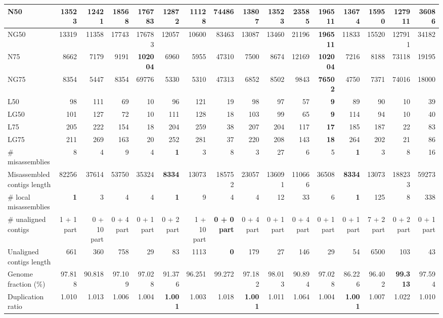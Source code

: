 \documentclass[12pt,a4paper]{article}
\begin{document}
\begin{table}[ht]
\begin{center}
\begin{tabular}{|l*{15}{|r}|}
N50 & 13523 & 12421 & 18568 & 176783 & 12872 & 11128 & 74486 & 13807 & 13523 & 23585 & {\bf 196511} & 13674 & 15950 & 127911 & 36086 \\ \hline
NG50 & 13319 & 11358 & 17743 & 176783 & 12057 & 10600 & 83463 & 13087 & 13460 & 21196 & {\bf 196511} & 11833 & 15520 & 127911 & 34182 \\ \hline
N75 & 8662 & 7179 & 9191 & {\bf 102004} & 6960 & 5955 & 47310 & 7500 & 8674 & 12169 & {\bf 102004} & 7216 & 8188 & 73118 & 19195 \\ \hline
NG75 & 8354 & 5447 & 8354 & 69776 & 5330 & 5310 & 47313 & 6852 & 8502 & 9843 & {\bf 76502} & 4750 & 7371 & 74016 & 18000 \\ \hline
L50 & 98 & 111 & 69 & 10 & 96 & 121 & 19 & 98 & 97 & 57 & {\bf 9} & 89 & 90 & 10 & 39 \\ \hline
LG50 & 101 & 127 & 72 & 10 & 111 & 128 & 18 & 103 & 99 & 65 & {\bf 9} & 114 & 94 & 10 & 40 \\ \hline
L75 & 205 & 222 & 154 & 18 & 204 & 259 & 38 & 207 & 204 & 117 & {\bf 17} & 185 & 187 & 22 & 83 \\ \hline
LG75 & 211 & 269 & 163 & 20 & 252 & 281 & 37 & 220 & 208 & 143 & {\bf 18} & 264 & 202 & 21 & 86 \\ \hline
\# misassemblies & 8 & 4 & 9 & 4 & {\bf 1} & 3 & 8 & 3 & 27 & 6 & 5 & {\bf 1} & 3 & 8 & 16 \\ \hline
Misassembled contigs length & 82256 & 37614 & 53750 & 35324 & {\bf 8334} & 13073 & 185752 & 23057 & 136091 & 110666 & 36508 & {\bf 8334} & 13073 & 188233 & 59273 \\ \hline
\# local misassemblies & {\bf 1} & 3 & 4 & 4 & {\bf 1} & 9 & 4 & 4 & 12 & 33 & 6 & {\bf 1} & 125 & 8 & 338 \\ \hline
\# unaligned contigs & 1 + 1 part & 0 + 10 part & 0 + 4 part & 0 + 1 part & 0 + 2 part & 1 + 10 part & {\bf 0 + 0 part} & 0 + 4 part & 0 + 1 part & 0 + 4 part & 0 + 1 part & 0 + 1 part & 7 + 2 part & 0 + 2 part & 0 + 1 part \\ \hline
Unaligned contigs length & 661 & 360 & 758 & 29 & 83 & 1113 & {\bf 0} & 179 & 27 & 146 & 29 & 54 & 6500 & 103 & 43 \\ \hline
Genome fraction (\%) & 97.818 & 90.818 & 97.109 & 97.028 & 91.376 & 96.251 & 99.272 & 97.182 & 98.013 & 90.894 & 97.028 & 86.226 & 96.402 & {\bf 99.313} & 97.594 \\ \hline
Duplication ratio & 1.010 & 1.013 & 1.006 & 1.004 & {\bf 1.001} & 1.003 & 1.018 & {\bf 1.001} & 1.011 & 1.064 & 1.004 & {\bf 1.001} & 1.007 & 1.022 & 1.010 \\ \hline

\end{tabular}
\end{center}
\end{table}
\end{document}
